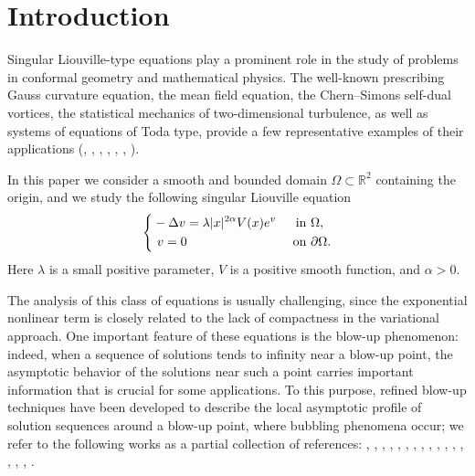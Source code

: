 \documentclass[reqno,11pt]{amsart}
\theoremstyle{definition}
\numberwithin{equation}{section}
\newcommand{\D}{\Delta}
\newcommand{\R}{\mathbb{R}}
\newcommand{\la}{\lambda}
\renewcommand{\(}{\left(}
\renewcommand{\)}{\right)}
\renewcommand{\[}{\left[}
\renewcommand{\]}{\right]}
\begin{document}
\maketitle

{\Large\section{\bf{ Introduction}}}


Singular Liouville-type equations play a prominent role in the study of problems in conformal geometry and mathematical physics.
The well-known  prescribing Gauss curvature equation, the mean field equation, the Chern–Simons self-dual vortices, the statistical mechanics of two-dimensional turbulence,
as well as systems of equations of  Toda type, provide a few representative examples of their applications (\cite{calipuma}, \cite{chaki}, \cite{joliwa}, \cite{ta1}, \cite{ta2}, \cite{tro}, \cite{ya}). 

In this paper  we consider a smooth and bounded domain $\Omega\subset\R^2$  containing the origin,  and we study the following singular Liouville equation 
 \begin{equation}\label{eq00}
  \left\{
      \begin{aligned}&- \D v = \la |x|^{2\alpha}V(x)e^v
      &  \hbox{ in }&  \Omega,\\
    &  \ v=0 &  \hbox{ on }& \partial \Omega.
  \end{aligned}
    \right. \end{equation}
Here $\la$ is a small positive  parameter,  
$V$ is a positive smooth function, and $\alpha>0$. 

The analysis of this class of equations is usually challenging, since the exponential nonlinear term is closely related to the lack of compactness in the variational approach. One important feature of these equations is the blow-up phenomenon: indeed, when a sequence of solutions tends to infinity near a blow-up point, the asymptotic behavior of the solutions near such a point carries important information that is crucial for  some applications.
To this purpose, refined blow-up techniques have been developed to describe the local asymptotic profile of solution sequences around a blow-up point, where bubbling phenomena occur; we refer to  the following works as a partial collection of references: \cite{bachenlita}, \cite{bata}, \cite{breme}, \cite{chenlin00}, \cite{chenlin0}, \cite{ChenLin}, \cite{delkomu}, \cite{espogropi}, \cite{li}, \cite{lisha}, \cite{mawe}, \cite{mal}, \cite{nasu}, \cite{su}, \cite{tar}, \cite{we}, \cite{zha1}.
\end{document}
